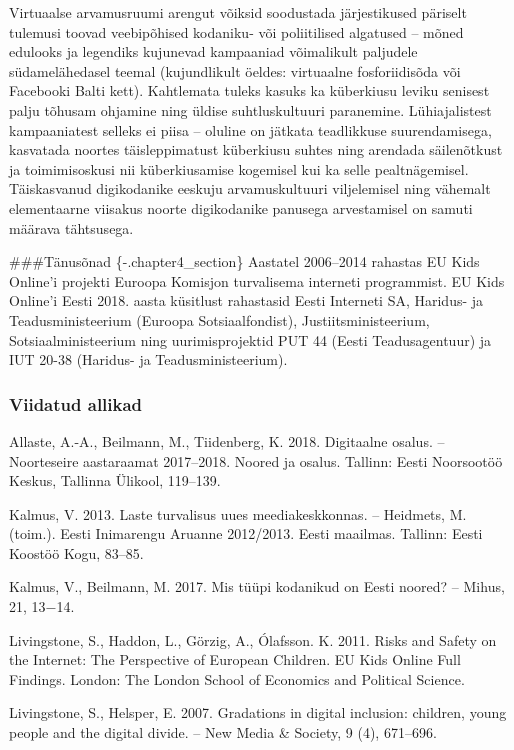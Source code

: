 \documentclass[estonian,]{article}
\begin{document}
Virtuaalse arvamusruumi arengut võiksid soodustada järjestikused päriselt tulemusi toovad veebipõhised kodaniku- või poliitilised algatused -- mõned edulooks ja legendiks kujunevad kampaaniad võimalikult paljudele südamelähedasel teemal (kujundlikult öeldes: virtuaalne fosforiidisõda või Facebooki Balti kett). Kahtlemata tuleks kasuks ka küberkiusu leviku senisest palju tõhusam ohjamine ning üldise suhtluskultuuri paranemine. Lühiajalistest kampaaniatest selleks ei piisa -- oluline on jätkata teadlikkuse suurendamisega, kasvatada noortes täisleppimatust küberkiusu suhtes ning arendada säilenõtkust ja toimimisoskusi nii küberkiusamise kogemisel kui ka selle pealtnägemisel. Täiskasvanud digikodanike eeskuju arvamuskultuuri viljelemisel ning vähemalt elementaarne viisakus noorte digikodanike panusega arvestamisel on samuti määrava tähtsusega.

\#\#\#Tänusõnad \{-.chapter4\_section\}
Aastatel 2006--2014 rahastas EU Kids Online'i projekti Euroopa Komisjon turvalisema interneti programmist. EU Kids Online'i Eesti 2018. aasta küsitlust rahastasid Eesti Interneti SA, Haridus- ja Teadusministeerium (Euroopa Sotsiaalfondist), Justiitsministeerium, Sotsiaalministeerium ning uurimisprojektid PUT 44 (Eesti Teadusagentuur) ja IUT 20-38 (Haridus- ja Teadusministeerium).

\hypertarget{viidatud-allikad-18}{%
\subsubsection*{Viidatud allikad}\label{viidatud-allikad-18}}

Allaste, A.-A., Beilmann, M., Tiidenberg, K. 2018. Digitaalne osalus. -- Noorteseire aastaraamat 2017--2018. Noored ja osalus. Tallinn: Eesti Noorsootöö Keskus, Tallinna Ülikool, 119--139.

Kalmus, V. 2013. Laste turvalisus uues meediakeskkonnas. -- Heidmets, M. (toim.). Eesti Inimarengu Aruanne 2012/2013. Eesti maailmas. Tallinn: Eesti Koostöö Kogu, 83--85.

Kalmus, V., Beilmann, M. 2017. Mis tüüpi kodanikud on Eesti noored? -- Mihus, 21, 13−14.

Livingstone, S., Haddon, L., Görzig, A., Ólafsson. K. 2011. Risks and Safety on the Internet: The Perspective of European Children. EU Kids Online Full Findings. London: The London School of Economics and Political Science.

Livingstone, S., Helsper, E. 2007. Gradations in digital inclusion: children, young people and the digital divide. -- New Media \& Society, 9 (4), 671--696.
\end{document}
